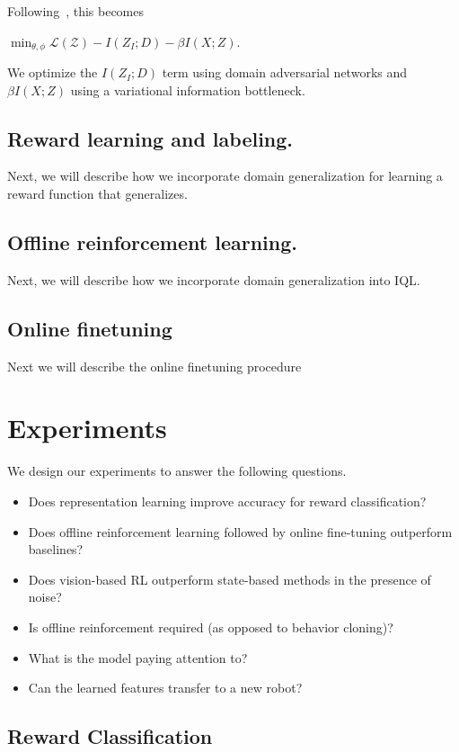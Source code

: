 \documentclass{article}
\begin{document}
Following~\citet{alemi2017vib}, this becomes

$\min_{\theta, \phi} \mathcal{L(Z)} - I(Z_I; D) - \beta I(X; Z)$.

We optimize the $I(Z_I; D)$ term using domain adversarial networks and $\beta I(X; Z)$ using a variational information bottleneck.

\subsection{Reward learning and labeling.}

Next, we will describe how we incorporate domain generalization for learning a reward function that generalizes.

\subsection{Offline reinforcement learning.}

Next, we will describe how we incorporate domain generalization into IQL.

\subsection{Online finetuning}

Next we will describe the online finetuning procedure

\section{Experiments}

We design our experiments to answer the following questions.
\begin{itemize}
    \item Does representation learning improve accuracy for reward classification?
    \item Does offline reinforcement learning followed by online fine-tuning outperform baselines?
    \item Does vision-based RL outperform state-based methods in the presence of noise?
    \item Is offline reinforcement required (as opposed to behavior cloning)?
    \item What is the model paying attention to?
    \item Can the learned features transfer to a new robot?
\end{itemize}

\subsection{Reward Classification}
\end{document}
